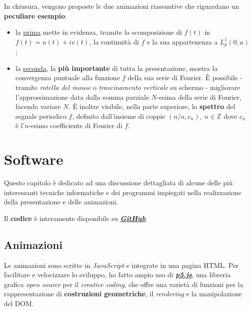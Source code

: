 \documentclass[
]{book}
\providecommand{\tightlist}{%
  \setlength{\itemsep}{0pt}\setlength{\parskip}{0pt}}
\begin{document}
In chiusura, vengono proposte le due animazioni riassuntive che riguardano un \textbf{peculiare esempio}:

\begin{itemize}
\tightlist
\item
  la \href{https://bradwave.github.io/thesis/\#/scomposizione}{prima} mette in evidenza, tramite la scomposizione di \(f(t)\) in \(f(t)=u(t)+iv(t)\), la continuità di \(f\) e la sua appartenenza a \(L^1_p(0,a)\);
\item
  la \href{https://bradwave.github.io/thesis/\#/animazione-polinomi-trigonometrici}{seconda}, la \textbf{più importante} di tutta la presentazione, mostra la convergenza puntuale alla funzione \(f\) della sua serie di Fourier. È possibile - tramite \emph{rotella del mouse} o \emph{trascinamento verticale} su schermo - migliorare l'approssimazione data dalla somma parziale \(N\)-esima della serie di Fourier, facendo variare \(N\). È inoltre visibile, nella parte superiore, lo \textbf{spettro} del segnale periodico \(f\), definito dall'insieme di coppie \((n/a,c_n), \ n \in \mathbb{Z}\) dove \(c_n\) è l'\(n\)-esimo coefficiente di Fourier di \(f\).
\end{itemize}

\hypertarget{software}{%
\chapter{Software}\label{software}}

Questo capitolo è dedicato ad una discussione dettagliata di alcune delle più interessanti tecniche informatiche e dei programmi impiegati nella realizzazione della presentazione e delle animazioni.

Il \textbf{codice} è interamente disponibile su \href{https://github.com/Bradwave/thesis}{\emph{\textbf{GitHub}}}.

\hypertarget{softan}{%
\section{Animazioni}\label{softan}}

Le animazioni sono scritte in \emph{JavaScript} e integrate in una pagina HTML. Per facilitare e velocizzare lo sviluppo, ho fatto ampio uso di \href{https://p5js.org/}{\emph{\textbf{p5.js}}}, una libreria grafica \emph{open source} per il \emph{creative coding}, che offre una varietà di funzioni per la rappresentazione di \textbf{costruzioni geometriche}, il \emph{rendering} e la manipolazione del DOM.
\end{document}
